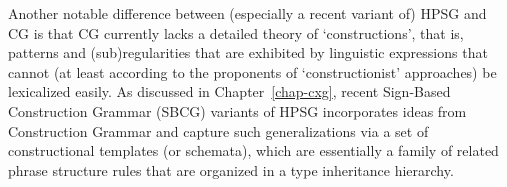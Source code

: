 \documentclass[output=paper]{langsci/langscibook}
\begin{document}


Another notable difference between (especially a recent variant of)
HPSG and CG is that CG currently lacks a detailed theory of
`constructions', 
that is, patterns and (sub)regularities that are
exhibited by linguistic expressions that cannot (at least according to
the proponents of `constructionist' approaches) be lexicalized easily.
As discussed in Chapter~\ref{chap-cxg},  recent Sign-Based Construction
Grammar (SBCG) variants of HPSG \citep{SBK2012a} 
incorporates ideas from Construction Grammar \citep{Goldberg95a} and capture such
generalizations via a set of constructional templates (or schemata),
which are essentially a family of related phrase structure rules that
are organized in a type inheritance hierarchy.
\end{document}
